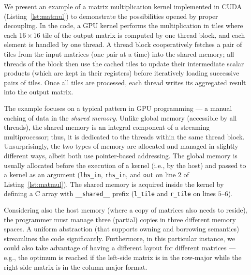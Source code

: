 We present an example of a matrix multiplication kernel implemented in CUDA (Listing~\ref{lst:matmul}) to demonstrate the possibilities opened by proper decoupling. In the code, a GPU kernel performs the multiplication in tiles where each $16\times16$ tile of the output matrix is computed by one thread block, and each element is handled by one thread. A thread block cooperatively fetches a pair of tiles from the input matrices (one pair at a time) into the shared memory; all threads of the block then use the cached tiles to update their intermediate scalar products (which are kept in their registers) before iteratively loading successive pairs of tiles. Once all tiles are processed, each thread writes its aggregated result into the output matrix.

The example focuses on a typical pattern in GPU programming --- a manual caching of data in the \emph{shared memory}. Unlike global memory (accessible by all threads), the shared memory is an integral component of a streaming multiprocessor; thus, it is dedicated to the threads within the same thread block. Unsurprisingly, the two types of memory are allocated and managed in slightly different ways, albeit both use pointer-based addressing. The global memory is usually allocated before the execution of a kernel (i.e., by the host) and passed to a kernel as an argument (\texttt{lhs\_in}, \texttt{rhs\_in}, and \texttt{out} on line $2$ of Listing~\ref{lst:matmul}). The shared memory is acquired inside the kernel by defining a C array with \texttt{\_\_shared\_\_} prefix (\texttt{l\_tile} and \texttt{r\_tile} on lines $5$--$6$).

Considering also the host memory (where a copy of matrices also needs to reside), the programmer must manage three (partial) copies in three different memory spaces. A uniform abstraction (that supports owning and borrowing semantics) streamlines the code significantly. Furthermore, in this particular instance, we could also take advantage of having a different layout for different matrices --- e.g., the optimum is reached if the left-side matrix is in the row-major while the right-side matrix is in the column-major format.

